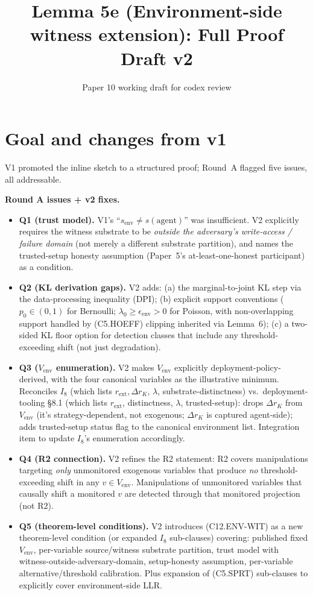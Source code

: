 \documentclass{article}
\title{Lemma 5e (Environment-side witness extension): Full Proof Draft v2}
\author{Paper 10 working draft for codex review}
\date{}
\newcommand{\rext}{r_{\mathrm{ext}}}
\newcommand{\Vem}{V_{\mathrm{env}}}
\newcommand{\eenv}{\epsilon_{\mathrm{env}}}
\begin{document}
\maketitle

\section{Goal and changes from v1}

V1 promoted the inline sketch to a structured proof; Round~A
flagged five issues, all addressable.

\textbf{Round A issues + v2 fixes.}
\begin{itemize}
\item \textbf{Q1 (trust model).}  V1's ``$s_{\mathrm{env}} \neq
  s(\mathrm{agent})$'' was insufficient.  V2 explicitly requires
  the witness substrate to be \emph{outside the adversary's
  write-access / failure domain} (not merely a different substrate
  partition), and names the trusted-setup honesty assumption
  (Paper~5's at-least-one-honest participant) as a condition.
\item \textbf{Q2 (KL derivation gaps).}  V2 adds:
  (a) the marginal-to-joint KL step via the data-processing
  inequality (DPI);
  (b) explicit support conventions ($p_0 \in (0,1)$ for Bernoulli;
  $\lambda_0 \geq \eenv > 0$ for Poisson, with non-overlapping
  support handled by (C5.HOEFF) clipping inherited via Lemma~6);
  (c) a two-sided KL floor option for detection classes that
  include any threshold-exceeding shift (not just degradation).
\item \textbf{Q3 ($V_{\mathrm{env}}$ enumeration).}  V2 makes
  $\Vem$ explicitly deployment-policy-derived, with the four
  canonical variables as the illustrative minimum.  Reconciles
  $I_8$ (which lists $\rext, \Delta r_K$, $\lambda$,
  substrate-distinctness) vs.\ deployment-tooling §8.1 (which lists
  $\rext$, distinctness, $\lambda$, trusted-setup): drops
  $\Delta r_K$ from $\Vem$ (it's strategy-dependent, not exogenous;
  $\Delta r_K$ is captured agent-side); adds trusted-setup status
  flag to the canonical environment list.  Integration item to
  update $I_8$'s enumeration accordingly.
\item \textbf{Q4 (R2 connection).}  V2 refines the R2 statement:
  R2 covers manipulations targeting \emph{only} unmonitored
  exogenous variables that produce \emph{no} threshold-exceeding
  shift in any $v \in \Vem$.  Manipulations of unmonitored
  variables that causally shift a monitored $v$ are detected
  through that monitored projection (not R2).
\item \textbf{Q5 (theorem-level conditions).}  V2 introduces
  (C12.ENV-WIT) as a new theorem-level condition (or expanded
  $I_8$ sub-clauses) covering: published fixed $\Vem$,
  per-variable source/witness substrate partition, trust model
  with witness-outside-adversary-domain, setup-honesty assumption,
  per-variable alternative/threshold calibration.  Plus expansion
  of (C5.SPRT) sub-clauses to explicitly cover environment-side
  LLR.
\end{itemize}
\end{document}
